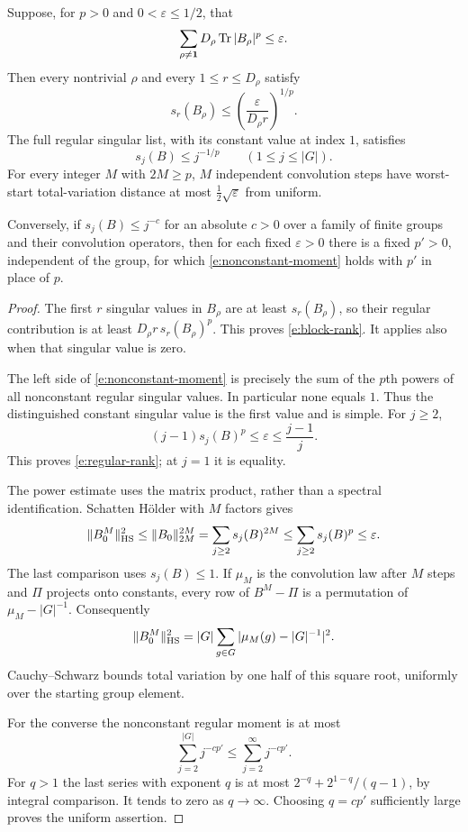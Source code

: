 \begin{proposition}\label{e:nonnormal-moment-conversion}
Suppose, for $p>0$ and $0<\varepsilon\le1/2$, that
\begin{equation}\label{e:nonconstant-moment}
 \sum_{\rho\ne\mathbf1}D_\rho\operatorname{Tr}|B_\rho|^p\le\varepsilon.
\end{equation}
Then every nontrivial $\rho$ and every $1\le r\le D_\rho$ satisfy
\begin{equation}\label{e:block-rank}
 s_r(B_\rho)\le\left(\frac{\varepsilon}{D_\rho r}\right)^{1/p}.
\end{equation}
The full regular singular list, with its constant value at index $1$, satisfies
\begin{equation}\label{e:regular-rank}
 s_j(B)\le j^{-1/p}\qquad(1\le j\le|G|).
\end{equation}
For every integer $M$ with $2M\ge p$, $M$ independent convolution steps have worst-start total-variation distance at most $\tfrac12\sqrt\varepsilon$ from uniform.

Conversely, if $s_j(B)\le j^{-c}$ for an absolute $c>0$ over a family of finite groups and their convolution operators, then for each fixed $\varepsilon>0$ there is a fixed $p'>0$, independent of the group, for which \eqref{e:nonconstant-moment} holds with $p'$ in place of $p$.
\end{proposition}
\begin{proof}
The first $r$ singular values in $B_\rho$ are at least $s_r(B_\rho)$, so their regular contribution is at least $D_\rho r\,s_r(B_\rho)^p$. This proves \eqref{e:block-rank}. It applies also when that singular value is zero.

The left side of \eqref{e:nonconstant-moment} is precisely the sum of the $p$th powers of all nonconstant regular singular values. In particular none equals $1$. Thus the distinguished constant singular value is the first value and is simple. For $j\ge2$,
\[
 (j-1)s_j(B)^p\le\varepsilon\le\frac{j-1}{j}.
\]
This proves \eqref{e:regular-rank}; at $j=1$ it is equality.

The power estimate uses the matrix product, rather than a spectral identification. Schatten H\"older with $M$ factors gives
\begin{equation}\label{e:holder-power}
 \|B_0^M\|_{\mathrm{HS}}^2
 \le\|B_0\|_{2M}^{2M}
 =\sum_{j\ge2}s_j(B)^{2M}
 \le\sum_{j\ge2}s_j(B)^p\le\varepsilon.
\end{equation}
The last comparison uses $s_j(B)\le1$. If $\mu_M$ is the convolution law after $M$ steps and $\Pi$ projects onto constants, every row of $B^M-\Pi$ is a permutation of $\mu_M-|G|^{-1}$. Consequently
\[
 \|B_0^M\|_{\mathrm{HS}}^2
 =|G|\sum_{g\in G}|\mu_M(g)-|G|^{-1}|^2.
\]
Cauchy--Schwarz bounds total variation by one half of this square root, uniformly over the starting group element.

For the converse the nonconstant regular moment is at most
\[
 \sum_{j=2}^{|G|}j^{-cp'}\le\sum_{j=2}^\infty j^{-cp'}.
\]
For $q>1$ the last series with exponent $q$ is at most
$2^{-q}+2^{1-q}/(q-1)$, by integral comparison. It tends to zero as $q\to\infty$. Choosing $q=cp'$ sufficiently large proves the uniform assertion.
\end{proof}

